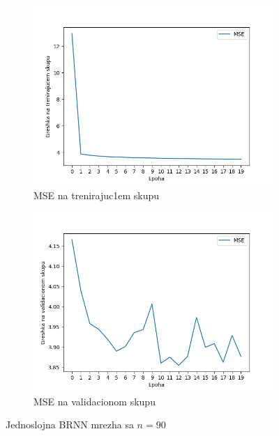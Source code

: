 \documentclass[a4paper, openany, oneside, 11pt]{book}
\begin{document}
\begin{figure}[!h]
        \centering
        \begin{subfigure}{0.475\textwidth}
            \centering
            \includegraphics[scale=0.45]{res/BidirectSingleLayerLSTM_90units_train.png}
            \caption{\acrshort{MSE} na trenirajuc1em skupu}
            \label{fig:4_8a}
            \vspace{0pt}
        \end{subfigure}%
        \begin{subfigure}{0.475\textwidth}
            \centering
            \includegraphics[scale=0.45]{res/BidirectSingleLayerLSTM_90units_validation.png}
            \caption{\acrshort{MSE} na validacionom skupu}
            \label{fig:4_8b}
            \vspace{0pt}
        \end{subfigure}
        \caption{Jednoslojna \acrshort{BRNN} mrezha sa $n=90$}
        \label{fig:4_8}
\end{figure}
\end{document}
